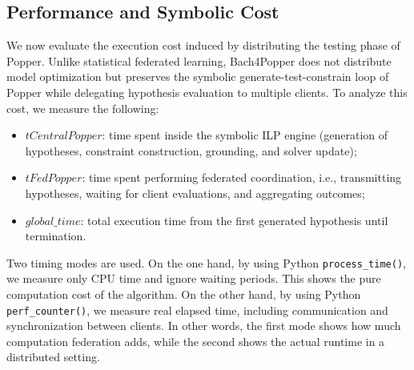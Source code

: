



\subsection{Performance and Symbolic Cost}

We now evaluate the execution cost induced by distributing the testing phase of Popper. Unlike statistical federated learning, Bach4Popper does not distribute model optimization but preserves the symbolic generate-test-constrain loop of Popper while delegating hypothesis evaluation to multiple clients. To analyze this cost, we measure the following:

\begin{itemize}
    \item \textbf{$tCentralPopper$}: time spent inside the symbolic ILP engine (generation of hypotheses, constraint construction, grounding, and solver update);
    \item \textbf{$tFedPopper$}: time spent performing federated coordination,
    i.e., transmitting hypotheses, waiting for client evaluations, and aggregating outcomes;
    \item \textbf{$global\_time$}: total execution time from the first generated
    hypothesis until termination.
\end{itemize}

\noindent
\begin{sloppypar}
Two timing modes are used. On the one hand, by using Python \texttt{process\_time()}, we 
measure only CPU time and ignore waiting periods. This shows the pure computation cost of the algorithm. On the other hand, by using Python \texttt{perf\_counter()}, we 
measure real elapsed time, including communication and synchronization between clients.
In other words, the first mode shows how much computation federation adds, while the second shows the actual runtime in a distributed setting.
\end{sloppypar}


